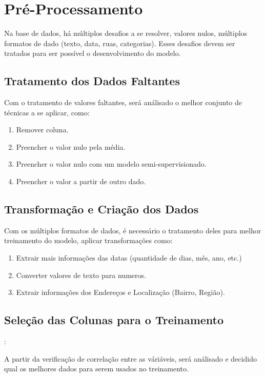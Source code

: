 \documentclass[a4paper,12pt]{article}
\begin{document}
\section{Pré-Processamento}

Na base de dados, há múltiplos desafios a se resolver, valores nulos, múltiplos formatos de dado (texto, data, ruas, categorias). Esses desafios devem ser tratados para ser possível o desenvolvimento do modelo.

\subsection{Tratamento dos Dados Faltantes}
Com o tratamento de valores faltantes, será análisado o melhor conjunto de técnicas a se aplicar, como:

\begin{enumerate}
    \item Remover coluna.
    \item Preencher o valor nulo pela média.
    \item Preencher o valor nulo com um modelo semi-supervisionado.
    \item Preencher o valor a partir de outro dado.
\end{enumerate}

\subsection{Transformação e Criação dos Dados}

Com os múltiplos formatos de dados, é necessário o tratamento deles para melhor treinamento do modelo, aplicar transformações como:

\begin{enumerate}
    \item Extrair mais informações das datas (quantidade de dias, mês, ano, etc.)
    \item Converter valores de texto para numeros.
    \item Extrair informações dos Endereços e Localização (Bairro, Região).
\end{enumerate}

\subsection{Seleção das Colunas para o Treinamento}:

A partir da verificação de correlação entre as váriáveis, será análisado e decidido qual os melhores dados para serem usados no treinamento.
\end{document}
